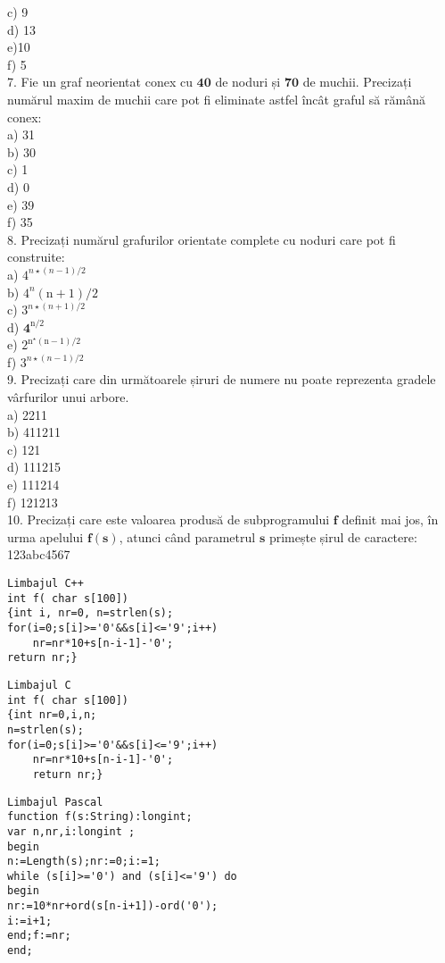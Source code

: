 c) 9\\
d) 13\\
e)10\\
f) 5\\
7. Fie un graf neorientat conex cu $\mathbf{4 0}$ de noduri și $\mathbf{7 0}$ de muchii. Precizați numărul maxim de muchii care pot fi eliminate astfel încât graful să rămână conex:\\
a) 31\\
b) 30\\
c) 1\\
d) 0\\
e) 39\\
f) 35\\
8. Precizați numărul grafurilor orientate complete cu noduri care pot fi construite:\\
a) $4^{n \star(n-1) / 2}$\\
b) $4^{n}(\mathrm{n}+1) / 2$\\
c) $3^{n \star(n+1) / 2}$\\
d) $\mathbf{4}^{\mathrm{n} / 2}$\\
e) $2^{\mathrm{n}^{\star}(\mathrm{n}-1) / 2}$\\
f) $3^{n \star(n-1) / 2}$\\
9. Precizați care din următoarele șiruri de numere nu poate reprezenta gradele vârfurilor unui arbore.\\
a) 2211\\
b) 411211\\
c) 121\\
d) 111215\\
e) 111214\\
f) 121213\\
10. Precizați care este valoarea produsă de subprogramului $\mathbf{f}$ definit mai jos, în urma apelului $\mathbf{f ( s )}$, atunci când parametrul $\mathbf{s}$ primește șirul de caractere: 123abc4567

\begin{verbatim}
Limbajul C++
int f( char s[100])
{int i, nr=0, n=strlen(s);
for(i=0;s[i]>='0'&&s[i]<='9';i++)
    nr=nr*10+s[n-i-1]-'0';
return nr;}
\end{verbatim}

\begin{verbatim}
Limbajul C
int f( char s[100])
{int nr=0,i,n;
n=strlen(s);
for(i=0;s[i]>='0'&&s[i]<='9';i++)
    nr=nr*10+s[n-i-1]-'0';
    return nr;}
\end{verbatim}

\begin{verbatim}
Limbajul Pascal
function f(s:String):longint;
var n,nr,i:longint ;
begin
n:=Length(s);nr:=0;i:=1;
while (s[i]>='0') and (s[i]<='9') do
begin
nr:=10*nr+ord(s[n-i+1])-ord('0');
i:=i+1;
end;f:=nr;
end;
\end{verbatim}

